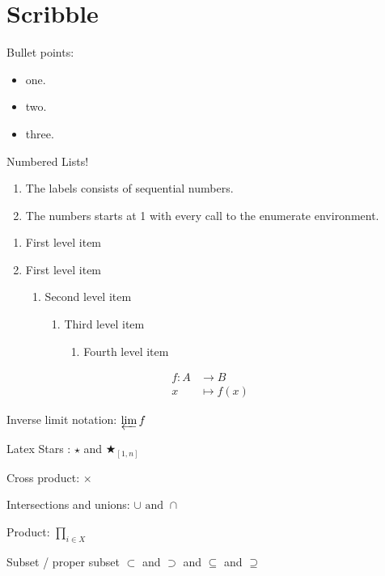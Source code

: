 \documentclass[12pt]{article}
\theoremstyle{definition}
\begin{document}
\section{Scribble}

Bullet points:
\begin{itemize}

\item one.

\item two. 

\item three.

\end{itemize}

Numbered Lists! 
\begin{enumerate}
  \item The labels consists of sequential numbers.
  \item The numbers starts at 1 with every call to the enumerate environment.
\end{enumerate}

\begin{enumerate}
   \item First level item
   \item First level item
   \begin{enumerate}
     \item Second level item
     \begin{enumerate}
       \item Third level item
       \begin{enumerate}
         \item Fourth level item
       \end{enumerate}
     \end{enumerate}
   \end{enumerate}
 \end{enumerate}


\begin{align*}
f \colon A &\to B \\
x &\mapsto f(x)
\end{align*}

Inverse limit notation: $\varprojlim f$

Latex Stars : $\star $ and $\bigstar_{[1,n]}$

Cross product: $\times$

Intersections and unions: $\cup \text{ and } \cap $

Product: $\prod_{i \in X}$

Subset / proper subset $\subset$ and $\supset$ and $\subseteq$ and $\supseteq$
\end{document}
